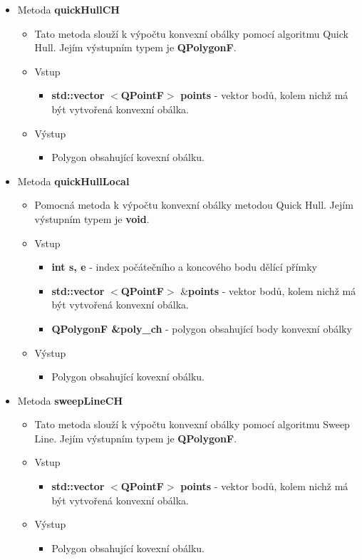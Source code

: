 \documentclass[a4paper, 12pt]{article}
\begin{document}
\begin{itemize}
	\item Metoda \textbf{quickHullCH}
		\begin{itemize}
			\item Tato metoda slouží k výpočtu konvexní obálky pomocí algoritmu Quick Hull. Jejím výstupním typem je \textbf{QPolygonF}.
			\item Vstup
				\begin{itemize}
					\item \textbf{std::vector} $<$\textbf{QPointF}$>$ \textbf{points} - vektor bodů, kolem nichž má být vytvořená konvexní obálka.
				\end{itemize}
			\item Výstup
				\begin{itemize}
					\item Polygon obsahující kovexní obálku.
				\end{itemize} 
		\end{itemize}

	\item Metoda \textbf{quickHullLocal}
		\begin{itemize}
			\item Pomocná metoda k výpočtu konvexní obálky metodou Quick Hull. Jejím výstupním typem je \textbf{void}.
			\item Vstup
				\begin{itemize}
					\item \textbf{int s, e} - index počátečního a koncového bodu dělící přímky
					\item \textbf{std::vector} $<$\textbf{QPointF}$>$ \&\textbf{points} - vektor bodů, kolem nichž má být vytvořená konvexní obálka.
					\item \textbf{QPolygonF \&poly\_ch} - polygon obsahující body konvexní obálky
				\end{itemize}
			\item Výstup
				\begin{itemize}
					\item Polygon obsahující kovexní obálku.
				\end{itemize} 
		\end{itemize}

	\item Metoda \textbf{sweepLineCH}
		\begin{itemize}
			\item Tato metoda slouží k výpočtu konvexní obálky pomocí algoritmu Sweep Line. Jejím výstupním typem je \textbf{QPolygonF}.
			\item Vstup
				\begin{itemize}
					\item \textbf{std::vector} $<$\textbf{QPointF}$>$ \textbf{points} - vektor bodů, kolem nichž má být vytvořená konvexní obálka.
				\end{itemize}
			\item Výstup
				\begin{itemize}
					\item Polygon obsahující kovexní obálku.
				\end{itemize} 
		\end{itemize}


\end{itemize}
\end{document}
